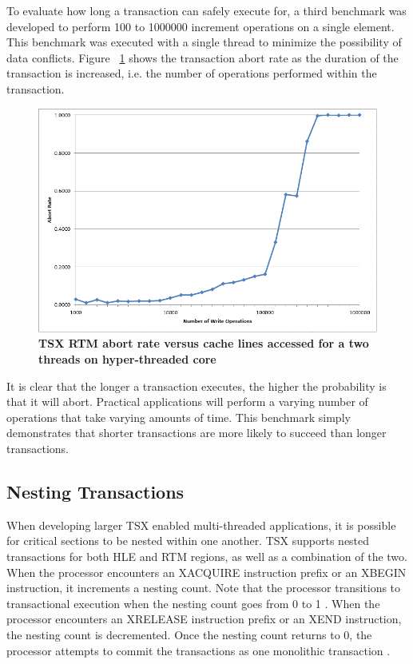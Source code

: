 \documentclass[a4paper]{article}
\begin{document}
\indent
To evaluate how long a transaction can safely execute for, a third
benchmark was developed to perform 100 to 1000000 increment operations on a
single element.  This benchmark was executed with a single thread to minimize
the possibility of data conflicts. Figure ~\ref{fig:trx_duration} shows the
transaction abort rate as the duration of the transaction is increased, i.e. the
number of operations performed within the transaction.
\par

\begin{figure}[H]
    \centering
    \graphicspath{ {./figures/} }
    \includegraphics[width=\textwidth,height=\textheight,keepaspectratio]{trx_duration}
    \caption{\textbf{TSX RTM abort rate versus cache lines accessed for a two 
    threads on hyper-threaded core}}
    \label{fig:trx_duration}
\end{figure}

\indent 
It is clear that the longer a transaction executes, the higher the probability
is that it will abort.  Practical applications will perform a varying number of
operations that take varying amounts of time.  This benchmark simply
demonstrates that shorter transactions are more likely to succeed than longer
transactions.
\par

\subsection{\textbf{Nesting Transactions}}

\indent
When developing larger TSX enabled multi-threaded applications, it is
possible for critical sections to be nested within one another.  TSX supports
nested transactions for both HLE and RTM regions, as well as a combination of
the two.  When the processor encounters an XACQUIRE instruction prefix or an 
XBEGIN instruction, it increments a nesting count.  Note that the processor
transitions to transactional execution when the nesting count goes from 0 to 1
\cite{intel_prog_ref}.  When the processor encounters an XRELEASE instruction
prefix or an XEND instruction, the nesting count is decremented.  Once the
nesting count returns to 0, the processor attempts to commit the transactions as
one monolithic transaction \cite{intel_prog_ref}.
\par
\end{document}
